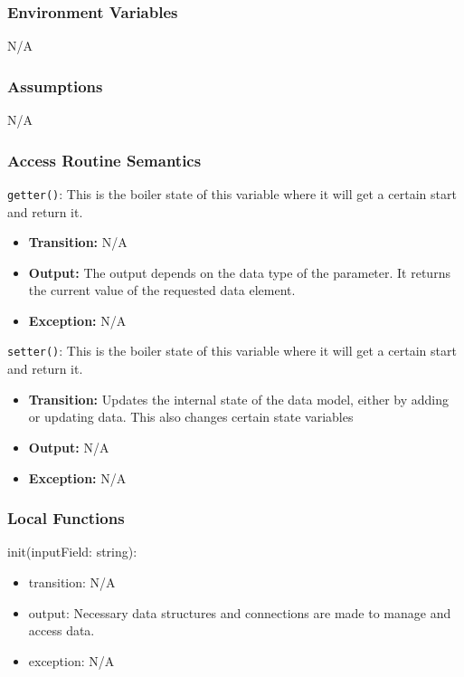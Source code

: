 \documentclass[12pt, titlepage]{article}
\begin{document}
\subsubsection{Environment Variables}

N/A

\subsubsection{Assumptions}

N/A

\subsubsection{Access Routine Semantics}

\noindent \texttt{getter()}: This is the boiler state of this variable where it will get a certain start and return it.
\begin{itemize}
    \item \textbf{Transition:} N/A
    \item \textbf{Output:} The output depends on the data type of the parameter. It returns the current value of the requested data element.
    \item \textbf{Exception:} N/A
\end{itemize}

\noindent \texttt{setter()}: This is the boiler state of this variable where it will get a certain start and return it.
\begin{itemize}
    \item \textbf{Transition:} Updates the internal state of the data model, either by adding or updating data. This also changes certain state variables
    \item \textbf{Output:} N/A
    \item \textbf{Exception:} N/A
\end{itemize}

\subsubsection{Local Functions}

\noindent init(inputField: string):
\begin{itemize}
\item transition: N/A
\item output: Necessary data structures and connections are made to manage and access data.
\item exception: N/A
\end{itemize}
\end{document}
